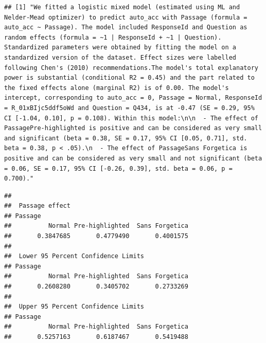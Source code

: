 \documentclass[pdf]{apa6}
\begin{document}
\begin{verbatim}
## [1] "We fitted a logistic mixed model (estimated using ML and Nelder-Mead optimizer) to predict auto_acc with Passage (formula = auto_acc ~ Passage). The model included ResponseId and Question as random effects (formula = ~1 | ResponseId + ~1 | Question). Standardized parameters were obtained by fitting the model on a standardized version of the dataset. Effect sizes were labelled following Chen's (2010) recommendations.The model's total explanatory power is substantial (conditional R2 = 0.45) and the part related to the fixed effects alone (marginal R2) is of 0.00. The model's intercept, corresponding to auto_acc = 0, Passage = Normal, ResponseId = R_01xBIjc5ddf5oWd and Question = Q434, is at -0.47 (SE = 0.29, 95% CI [-1.04, 0.10], p = 0.108). Within this model:\n\n  - The effect of PassagePre-highlighted is positive and can be considered as very small and significant (beta = 0.38, SE = 0.17, 95% CI [0.05, 0.71], std. beta = 0.38, p < .05).\n  - The effect of PassageSans Forgetica is positive and can be considered as very small and not significant (beta = 0.06, SE = 0.17, 95% CI [-0.26, 0.39], std. beta = 0.06, p = 0.700)."
\end{verbatim}

\begin{Shaded}
\begin{Highlighting}[]
\StringTok{ }\NormalTok{(}
\end{Highlighting}
\end{Shaded}

\begin{verbatim}
## 
##  Passage effect
## Passage
##          Normal Pre-highlighted  Sans Forgetica 
##       0.3847685       0.4779490       0.4001575 
## 
##  Lower 95 Percent Confidence Limits
## Passage
##          Normal Pre-highlighted  Sans Forgetica 
##       0.2608280       0.3405702       0.2733269 
## 
##  Upper 95 Percent Confidence Limits
## Passage
##          Normal Pre-highlighted  Sans Forgetica 
##       0.5257163       0.6187467       0.5419488
\end{verbatim}
\end{document}
